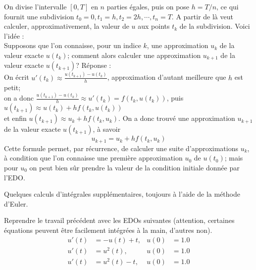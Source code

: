 \documentclass{exam}
\begin{document}
\begin{questions}
On divise l'intervalle $[0, T]$ en $n$ parties égales, puis on pose $h=T/n$, ce qui fournit une subdivision $t_0 = 0, t_1 = h, t_2 = 2h, \cdots, t_n = T$. A partir de là veut calculer, approximativement, la valeur de $u$ aux points $t_k$ de la subdivision. Voici l'idée :\\
Supposons que l'on connaisse, pour un indice $k$, une approximation $u_k$ de la valeur exacte $u(t_k)$; comment alors calculer une approximation $u_{k+1}$ de la valeur exacte $u(t_{k+1})$? Réponse :\\
On écrit $u'(t_k) \approx \frac{u(t_{k+1})-u(t_k)}{h}$, approximation d'autant meilleure que $h$ est petit;\\
 on a donc 
 $\frac{u(t_{k+1})-u(t_k)}{h} \approx u'(t_k) = f(t_k, u(t_k))$, puis $u(t_{k+1}) \approx u(t_k) + hf(t_k, u(t_k))$\\
  et enfin 
  $u(t_{k+1}) \approx u_k + hf(t_k, u_k)$. On a donc trouvé une approximation $u_{k+1}$ de la valeur exacte $u(t_{k+1})$, à savoir 
$$u_{k+1} = u_k + hf(t_k, u_k)$$
Cette formule permet, par récurrence, de calculer une suite d'approximations $u_k$, à condition que l'on connaisse une première approximation $u_0$ de $u(t_0)$; mais pour $u_0$ on peut bien sûr prendre la valeur de la condition initiale donnée par l'EDO.

\question
Quelques calculs d'intégrales supplémentaires, toujours à l'aide de la méthode d'Euler.

Reprendre le travail précédent avec les EDOs suivantes (attention, certaines équations peuvent être facilement intégrées à la main, d'autres non).
\begin{align} 
u'(t) &=  -u(t) + t, & u(0)  &=  1.0 \\ 
u'(t) &=  u^2(t), & u(0)  &=  1.0 \\ 
u'(t) &=  u^2(t) - t, & u(0)  &=  1.0
\end{align}

\question


\end{questions}
\end{document}
